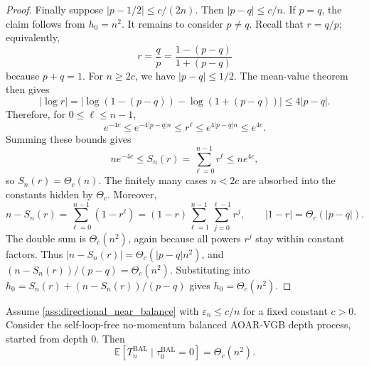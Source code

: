 \documentclass{article}
\numberwithin{theorem}{section}
\numberwithin{proposition}{section}
\numberwithin{corollary}{section}
\numberwithin{lemma}{section}
\numberwithin{conjecture}{section}
\numberwithin{remark}{section}
\numberwithin{definition}{section}
\numberwithin{assumption}{section}
\numberwithin{example}{section}
\newcommand{\bbE}{\mathbb{E}}
\newcommand{\lbra}[1]{\left[#1\right]}
\newcommand{\sbra}[1]{\left(#1\right)}
\newcommand{\abs}[1]{\left| #1\right|}
\begin{document}
\begin{proof}
Finally suppose $\abs{p-1/2}\le c/(2n)$. Then $\abs{p-q}\le c/n$. If $p=q$, the claim follows from $h_0=n^2$. It remains to consider $p\ne q$. Recall that $r=q/p$; equivalently,
\begin{equation*}
    r=\frac{q}{p}=\frac{1-(p-q)}{1+(p-q)}
\end{equation*}
because $p+q=1$. For $n\ge 2c$, we have $\abs{p-q}\le 1/2$. The mean-value theorem then gives
\begin{equation*}
    \abs{\log r}
    =
    \abs{\log\sbra{1-(p-q)}-\log\sbra{1+(p-q)}}
    \le 4\abs{p-q}.
\end{equation*}
Therefore, for $0\le \ell\le n-1$,
\begin{equation*}
    e^{-4c}\le e^{-4\abs{p-q}n}\le r^\ell \le e^{4\abs{p-q}n}\le e^{4c}.
\end{equation*}
Summing these bounds gives
\begin{equation*}
    ne^{-4c}\le S_n(r)=\sum_{\ell=0}^{n-1}r^\ell\le ne^{4c},
\end{equation*}
so $S_n(r)=\Theta_c(n)$. The finitely many cases $n<2c$ are absorbed into the constants hidden by $\Theta_c$.
Moreover,
\begin{equation*}
    n-S_n(r)
    =
    \sum_{\ell=0}^{n-1}(1-r^\ell)
    =
    (1-r)\sum_{\ell=1}^{n-1}\sum_{j=0}^{\ell-1}r^j,
    \qquad
    \abs{1-r}=\Theta_c(\abs{p-q}).
\end{equation*}
The double sum is $\Theta_c(n^2)$, again because all powers $r^j$ stay within constant factors. Thus $\abs{n-S_n(r)}=\Theta_c(\abs{p-q}n^2)$, and $(n-S_n(r))/(p-q)=\Theta_c(n^2)$. Substituting into $h_0=S_n(r)+(n-S_n(r))/(p-q)$ gives $h_0=\Theta_c(n^2)$.
\end{proof}

\begin{proposition}
\label{prop:no_momentum_near_balance_quadratic}
Assume \cref{ass:directional_near_balance} with $\varepsilon_n\le c/n$ for a fixed constant $c>0$. Consider the self-loop-free no-momentum balanced AOAR-VGB depth process, started from depth $0$. Then
\begin{equation*}
    \bbE\lbra{T_n^{\mathrm{BAL}}\mid \tau_0^{\mathrm{BAL}}=0}=\Theta_c(n^2).
\end{equation*}
\end{proposition}
\end{document}
